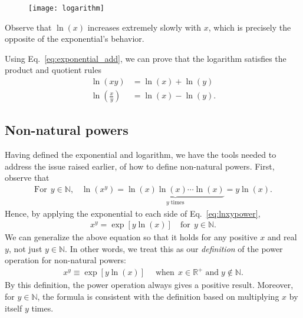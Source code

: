 \documentclass[10pt,a4paper]{article}
\begin{document}
\begin{figure}[ht]
  \centering\texttt{[image: logarithm]}
\end{figure}

\noindent
Observe that $\ln(x)$ increases extremely slowly with $x$, which is
precisely the opposite of the exponential's behavior.

Using Eq.~\eqref{eq:exponential_add}, we can prove that the logarithm
satisfies the product and quotient rules
\begin{align}
  \ln(xy) &= \ln(x) + \ln(y) \\
  \ln\left(\frac{x}{y}\right) &= \ln(x) - \ln(y).
\end{align}

\subsection{Non-natural powers}
\label{powers}

Having defined the exponential and logarithm, we have the tools needed
to address the issue raised earlier, of how to define non-natural
powers.  First, observe that
\begin{align}
  \textrm{For}\;\,y \in \mathbb{N}, \;\;\;\ln(x^y) = \underbrace{\ln(x)\ln(x)\cdots\ln(x)}_{y\;\text{times}} = y \ln(x).
  \label{eq:lnxypower}
\end{align}
Hence, by applying the exponential to each side of
Eq.~\eqref{eq:lnxypower},
\begin{align}
  x^y = \exp[y \ln(x)] \quad \mathrm{for} \;\,y \in \mathbb{N}.
\end{align}
We can generalize the above equation so that it holds for any positive
$x$ and real $y$, not just $y \in \mathbb{N}$.  In other words, we
treat this as our \textit{definition} of the power operation for
non-natural powers:
\begin{align}
  x^y \equiv \exp[y \ln(x)] \quad\; \mathrm{when}\;\, x \in \mathbb{R}^+\;\textrm{and}\;y \notin \mathbb{N}.
\end{align}
By this definition, the power operation always gives a positive
result.  Moreover, for $y \in \mathbb{N}$, the formula is consistent
with the definition based on multiplying $x$ by itself $y$ times.
\end{document}
